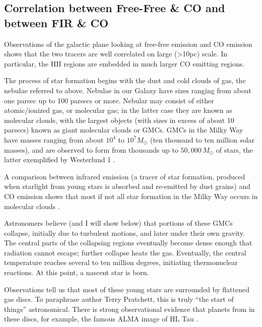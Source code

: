 \documentclass[../dissertation.tex]{subfiles}
\begin{document}
\subsection{Correlation between Free-Free \& CO and between FIR \& CO} \label{sec:Intro_FF_and_CO}

Observations of the galactic plane looking at free-free emission and CO emission shows that the two tracers are well correlated on large (>10pc) scale. In particular, the HII regions are embedded in much larger CO emitting regions. 

The process of star formation begins with the dust and cold clouds of gas, the nebulae referred to above. 
Nebulae in our Galaxy have sizes ranging from about one parsec up to 100 parsecs or more. 
Nebular may consist of either atomic/ionized gas, or molecular gas; 
in the latter case they are known as molecular clouds, with the largest objects (with sizes in excess of about 10 parsecs) known as giant molecular clouds or GMCs. 
GMCs in the Milky Way have masses ranging from about $10^4$ to $10^7M_\odot$ (ten thousand to ten million solar masses), 
and are observed to form from thousands up to $50,000\,M_\odot$ of stars, the latter exemplified by Westerlund 1 \citep{2017A&A...602A..22A}. 

A comparison between infrared emission (a tracer of star formation, produced when starlight from young stars is absorbed and re-emitted by dust grains) and CO emission shows that most if not all star formation in the Milky Way occurs in molecular clouds \citep{1989ApJ...339..149S}. 

Astronomers believe (and I will show below) that portions of these GMCs collapse, initially due to turbulent motions, and later under their own gravity. 
The central parts of the collapsing regions eventually become dense enough that radiation cannot escape; further collapse heats the gas. 
Eventually, the central temperature reaches several to ten million degrees, initiating  thermonuclear reactions. At this point, a nascent star is born.

Observations tell us that most of these young stars are surrounded by flattened gas discs. To paraphrase author Terry Pratchett, this is truly ``the start of things'' astronomical. 
There is strong observational evidence that planets from in these discs, for example, the famous ALMA image of HL Tau \citep{2015ApJ...808L...3A}.

\end{document}
